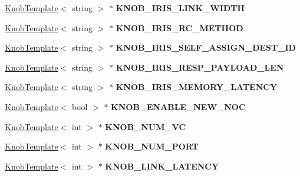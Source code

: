 \begin{DoxyCompactItemize}
\item 
\hypertarget{classall__knobs__c_a0a12d396bff120e95b1c1d0c73043f27}{
\hyperlink{classKnobTemplate}{KnobTemplate}$<$ string $>$ $\ast$ {\bfseries KNOB\_\-IRIS\_\-LINK\_\-WIDTH}}
\label{classall__knobs__c_a0a12d396bff120e95b1c1d0c73043f27}

\item 
\hypertarget{classall__knobs__c_ab9aefbd2f354cf3a92c2e4791d1093a6}{
\hyperlink{classKnobTemplate}{KnobTemplate}$<$ string $>$ $\ast$ {\bfseries KNOB\_\-IRIS\_\-RC\_\-METHOD}}
\label{classall__knobs__c_ab9aefbd2f354cf3a92c2e4791d1093a6}

\item 
\hypertarget{classall__knobs__c_ac9f6fb590ee28971ab63118aadc73271}{
\hyperlink{classKnobTemplate}{KnobTemplate}$<$ string $>$ $\ast$ {\bfseries KNOB\_\-IRIS\_\-SELF\_\-ASSIGN\_\-DEST\_\-ID}}
\label{classall__knobs__c_ac9f6fb590ee28971ab63118aadc73271}

\item 
\hypertarget{classall__knobs__c_ac6c9da415d0885ace87bb0bfb702b634}{
\hyperlink{classKnobTemplate}{KnobTemplate}$<$ string $>$ $\ast$ {\bfseries KNOB\_\-IRIS\_\-RESP\_\-PAYLOAD\_\-LEN}}
\label{classall__knobs__c_ac6c9da415d0885ace87bb0bfb702b634}

\item 
\hypertarget{classall__knobs__c_ab4b9b78b587603045d4abae7cd7e7c35}{
\hyperlink{classKnobTemplate}{KnobTemplate}$<$ string $>$ $\ast$ {\bfseries KNOB\_\-IRIS\_\-MEMORY\_\-LATENCY}}
\label{classall__knobs__c_ab4b9b78b587603045d4abae7cd7e7c35}

\item 
\hypertarget{classall__knobs__c_ae185cafcc79ace0bf0243ae4befad3bd}{
\hyperlink{classKnobTemplate}{KnobTemplate}$<$ bool $>$ $\ast$ {\bfseries KNOB\_\-ENABLE\_\-NEW\_\-NOC}}
\label{classall__knobs__c_ae185cafcc79ace0bf0243ae4befad3bd}

\item 
\hypertarget{classall__knobs__c_abf33333882eb204abe6e8f9afb16c77a}{
\hyperlink{classKnobTemplate}{KnobTemplate}$<$ int $>$ $\ast$ {\bfseries KNOB\_\-NUM\_\-VC}}
\label{classall__knobs__c_abf33333882eb204abe6e8f9afb16c77a}

\item 
\hypertarget{classall__knobs__c_a85ea6d6e1680986e4aa351e20f4568e9}{
\hyperlink{classKnobTemplate}{KnobTemplate}$<$ int $>$ $\ast$ {\bfseries KNOB\_\-NUM\_\-PORT}}
\label{classall__knobs__c_a85ea6d6e1680986e4aa351e20f4568e9}

\item 
\hypertarget{classall__knobs__c_a2a26778e4a7dd8d3cdba21a46b58a42a}{
\hyperlink{classKnobTemplate}{KnobTemplate}$<$ int $>$ $\ast$ {\bfseries KNOB\_\-LINK\_\-LATENCY}}
\label{classall__knobs__c_a2a26778e4a7dd8d3cdba21a46b58a42a}


\end{DoxyCompactItemize}
